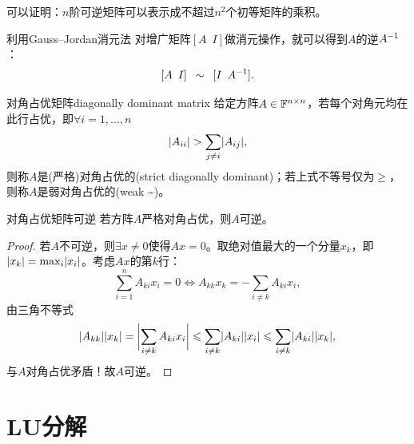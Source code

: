 \begin{remark}
	可以证明：$n$阶可逆矩阵可以表示成不超过$n^2$个初等矩阵的乘积。
\end{remark}

\begin{corollary}
	利用Gauss--Jordan消元法
	对增广矩阵$[A\enspace I]$做消元操作，就可以得到$A$的逆$A^{-1}$：
	\begin{equation}\label{eq:la-inverse-by-elimination}
		[A\enspace I]\enspace \sim \enspace[I\enspace A^{-1}].
	\end{equation}
\end{corollary}

\begin{definition}
	{对角占优矩阵}{diagonally dominant matrix}
	给定方阵$A \in \mathbb{F}^{n\times n}$，若每个对角元均在此行占优，即$\forall i = 1,\ldots,n$
	\begin{equation}
		\lvert A_{ii}\rvert > \sum_{j\neq i}\lvert A_{ij}\rvert,
	\end{equation}
	则称$A$是(严格)对角占优的(strict diagonally dominant)；若上式不等号仅为$\geq$，则称$A$是弱对角占优的(weak \textasciitilde)。
\end{definition}

\begin{theorem}
	{对角占优矩阵可逆}{}
	若方阵$A$严格对角占优，则$A$可逆。
\end{theorem}

\begin{proof}
	若$A$不可逆，则$\exists x \neq 0$使得$Ax = 0$。取绝对值最大的一个分量$x_k$，即$\textstyle\lvert x_k\rvert = \max_i\lvert x_i\rvert$。考虑$Ax$的第$k$行：
	\[
		\sum_{i=1}^nA_{ki}x_i = 0 \iff A_{kk}x_k = -\sum_{i\neq k}A_{ki}x_i,
	\]
	由三角不等式
	\[
		\lvert A_{kk}\rvert\lvert x_k\rvert = \biggl\lvert\sum_{i\neq k}A_{ki}x_i\biggr\rvert \leqslant \sum_{i\neq k}\lvert A_{ki}\rvert\lvert x_i\rvert \leqslant \sum_{i\neq k}\lvert A_{ki}\rvert\lvert x_k\rvert,
	\]
	与$A$对角占优矛盾！故$A$可逆。
\end{proof}

\section{LU分解}

